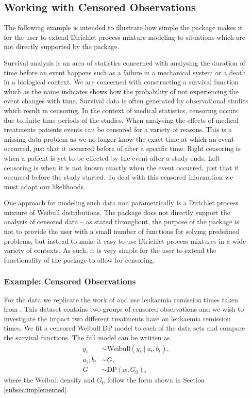 \documentclass[nojss]{jss}
\begin{document}
\subsection{Working with Censored Observations}
The following example is intended to illustrate how simple the  package makes it for the user to extend Dirichlet process mixture modeling to situations which are not directly supported by the package.

Survival analysis is an area of statistics concerned with analysing the duration of time before an event happens such as a failure in a mechanical system or a death in a biological context. We are concerned with constructing a survival function which as the name indicates shows how the probability of not experiencing the event changes with time. Survival data is often generated by observational studies which result in censoring. In the context of medical statistics, censoring occurs due to finite time periods of the studies. When analysing the effects of medical treatments patients events can be censored for a variety of reasons. This is a missing data problem as we no longer know the exact time at which an event occurred, just that it occurred before of after a specific time. Right censoring is when a patient is yet to be effected by the event after a study ends. Left censoring is when it is not known exactly when the event occurred, just that it occurred before the study started. To deal with this censored information we must adapt our likelihoods.

One approach for modeling such data non parametrically is a Dirichlet process mixture of Weibull distributions. The  package does not directly support the analysis of censored data -- as stated throughout, the purpose of the package is not to provide the user with a small number of functions for solving predefined problems, but instead to make it easy to use Dirichlet process mixtures in a wide variety of contexts. As such, it is very simple for the user to extend the functionality of the package to allow for censoring.

\subsubsection{Example: Censored Observations}

For the data we replicate the work of \cite{kottas_nonparametric_2006} and use leukaemia remission times taken from \cite{lawless_statistical_2011}. This dataset contains two groups of censored observations and we wish to investigate the impact two different treatments have on leukaemia remission times. We fit a censored Weibull DP model to each of the data sets and compare the survival functions. The full model can be written as
\begin{align*}
y _i & \sim \text{Weibull} ( y_i \mid a_i , b_i ), \\
a_i , b_i & \sim G, \\
G & \sim  \text{DP} (\alpha , G_0),
\end{align*}
where the Weibull density and $G_0$ follow the form shown in Section \ref{subsec:implemented}.
\end{document}
